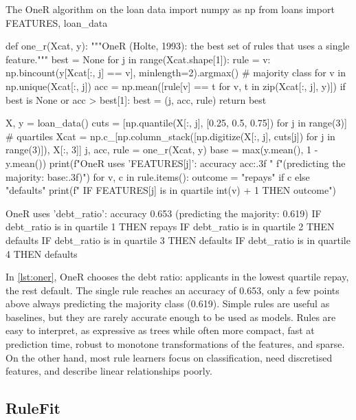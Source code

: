 \begin{pylisting}[label={lst:oner}]{The OneR algorithm on the loan data}
import numpy as np
from loans import FEATURES, loan_data

def one_r(Xcat, y):
    """OneR (Holte, 1993): the best set of rules that uses a single feature."""
    best = None
    for j in range(Xcat.shape[1]):
        rule = {v: np.bincount(y[Xcat[:, j] == v], minlength=2).argmax()   # majority class
                for v in np.unique(Xcat[:, j])}
        acc = np.mean([rule[v] == t for v, t in zip(Xcat[:, j], y)])
        if best is None or acc > best[1]:
            best = (j, acc, rule)
    return best

X, y = loan_data()
cuts = [np.quantile(X[:, j], [0.25, 0.5, 0.75]) for j in range(3)]    # quartiles
Xcat = np.c_[np.column_stack([np.digitize(X[:, j], cuts[j]) for j in range(3)]), X[:, 3]]
j, acc, rule = one_r(Xcat, y)
base = max(y.mean(), 1 - y.mean())
print(f"OneR uses '{FEATURES[j]}': accuracy {acc:.3f} "
      f"(predicting the majority: {base:.3f})")
for v, c in rule.items():
    outcome = "repays" if c else "defaults"
    print(f"  IF {FEATURES[j]} is in quartile {int(v) + 1} THEN {outcome}")
\end{pylisting}
\begin{pyoutput}
OneR uses 'debt_ratio': accuracy 0.653 (predicting the majority: 0.619)
  IF debt_ratio is in quartile 1 THEN repays
  IF debt_ratio is in quartile 2 THEN defaults
  IF debt_ratio is in quartile 3 THEN defaults
  IF debt_ratio is in quartile 4 THEN defaults
\end{pyoutput}

In \cref{lst:oner}, OneR chooses the debt ratio: applicants in the lowest quartile repay, the rest
default. The single rule reaches an accuracy of 0.653, only a few points above always predicting
the majority class (0.619). Simple rules are useful as baselines, but they are rarely accurate enough to be used as models.
Rules are easy to interpret, as expressive as trees while often more compact, fast at prediction
time, robust to monotone transformations of the features, and sparse. On the other hand, most rule
learners focus on classification, need discretised features, and describe linear relationships
poorly.

\subsection{RuleFit}

